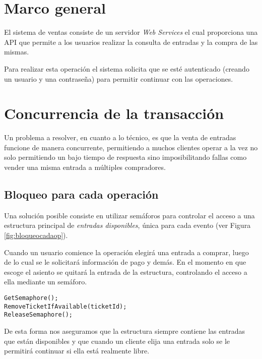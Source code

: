 \section{Marco general}

El sistema de ventas consiste de un servidor \emph{Web Services} el cual
proporciona una API que permite a los usuarios realizar la consulta de
entradas y la compra de las mismas.

Para realizar esta operación el sistema solicita que se esté autenticado
(creando un usuario y una contraseña) para permitir continuar con las
operaciones.

\section{Concurrencia de la transacción}
Un problema a resolver, en cuanto a lo técnico, es que la venta de
entradas funcione de manera concurrente, permitiendo a muchos clientes operar a
la vez no solo permitiendo un bajo tiempo de respuesta sino imposibilitando
fallas como vender una misma entrada a múltiples compradores.

\subsection{Bloqueo para cada operación} \label{alt-bloqueo}
Una solución posible consiste en utilizar semáforos para controlar el acceso a
una estructura principal de \emph{entradas disponibles}, única para cada evento
(ver Figura \ref{fig:bloqueocadaop}).

Cuando un usuario comience la operación elegirá una entrada a comprar, luego de
lo cual se le solicitará información de pago y demás. En el momento en que
escoge el asiento se quitará la entrada de la estructura, controlando el acceso
a ella mediante un semáforo.

\begin{figure}
\end{figure}

\begin{verbatim}
GetSemaphore();
RemoveTicketIfAvailable(ticketId);
ReleaseSemaphore();
\end{verbatim}

De esta forma nos aseguramos que la estructura siempre contiene las entradas que
están disponibles y que cuando un cliente elija una entrada solo se le
permitirá continuar si ella está realmente libre.

